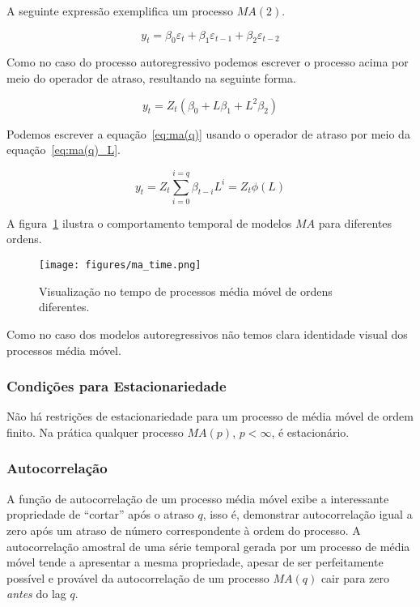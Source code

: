A seguinte expressão exemplifica um processo $MA(2)$.

$$ y_t = \beta_0 \varepsilon_t + \beta_1 \varepsilon_{t-1} + \beta_2 \varepsilon_{t-2} $$

Como no caso do processo autoregressivo podemos escrever o processo acima por
meio do operador de atraso, resultando na seguinte forma.

$$ y_t = Z_t (\beta_0 + L\beta_1 + L^2\beta_2) $$

Podemos escrever a equação~\ref{eq:ma(q)} usando o operador de atraso por meio
da equação~\ref{eq:ma(q)_L}.

\begin{equation}\label{eq:ma(q)_L}
    y_t = Z_t \sum_{i=0}^{i=q} \beta_{t-i} L^{i} = Z_t \phi(L)
\end{equation}

A figura~\ref{fig:ma_time} ilustra o comportamento temporal de modelos $MA$ para
diferentes ordens.

\begin{figure}[H]
    \centering
    \texttt{[image: figures/ma\_time.png]}
    \caption{Visualização no tempo de processos média móvel de ordens
    diferentes.}
    \label{fig:ma_time}
\end{figure}

Como no caso dos modelos autoregressivos não temos clara identidade visual dos
processos média móvel.

\subsubsection{Condições para Estacionariedade}

Não há restrições de estacionariedade para um processo de média móvel de ordem
finito. Na prática qualquer processo $MA(p)$, $p < \infty$, é estacionário.

\subsubsection{Autocorrelação}

A função de autocorrelação de um processo média móvel exibe a interessante
propriedade de ``cortar'' após o atraso $q$, isso é, demonstrar autocorrelação
igual a zero após um atraso de número correspondente à ordem do processo. A
autocorrelação amostral de uma série temporal gerada por um processo de média
móvel tende a apresentar a mesma propriedade, apesar de ser perfeitamente
possível e provável da autocorrelação de um processo $MA(q)$ cair para zero
\emph{antes} do lag $q$.

